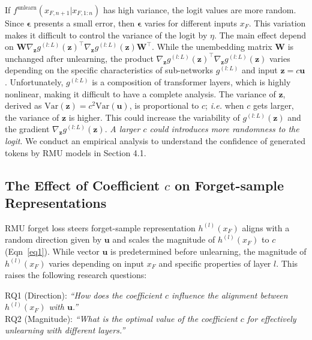 \documentclass[letterpaper]{article} %
\begin{document}
If $f^{\text{unlearn}}(x_{F,n+1}|x_{F,1:n})$ has high variance, the logit values are more random. Since $\bm\epsilon$ presents a small error, then $\bm\epsilon$ varies for different inputs $x_F$. This variation makes it difficult to control the variance of the logit by $\eta$. The main effect depend on $\bm W\nabla_{\bm z}g^{(l:L)}(\bm z)^{\top}\nabla_{\bm z}g^{(l:L)}(\bm z)\bm W^{\top}$. While the unembedding matrix $\bm W$ is unchanged after unlearning, the product $\nabla_{\bm z}g^{(l:L)}(\bm z)^{\top}\nabla_{\bm z}g^{(l:L)}(\bm z)$ varies depending on the specific characteristics of sub-networks $g^{(l:L)}$ and input $\bm z = c\bm u$. Unfortunately, $g^{(l:L)}$ is a composition of transformer layers, which is highly nonlinear, making it difficult to have a complete analysis. The variance of $\bm z$, derived as $\text{Var}(\bm z) = c^2\text{Var}(\bm u)$, is proportional to $c$; \textit{i.e.} when $c$ gets larger, the variance of $\bm z$ is higher. This could increase the variability of $g^{(l:L)}(\bm z)$ and the gradient $\nabla_{\bm z}g^{(l:L)}(\bm z)$. \textit{A larger $c$ could introduces more randomness to the logit}.  We conduct an empirical analysis to understand the confidence of generated tokens by RMU models in Section 4.1.

\subsection{The Effect of Coefficient $c$ on Forget-sample Representations}
\label{sec:3.2}
RMU forget loss steers forget-sample representation $h^{(l)}(x_F)$ aligns with a random direction given by $\bm u$ and scales the magnitude of $h^{(l)}(x_F)$ to $c$ (Eqn~\ref{eq1}). While vector $\bm u$ is predetermined before unlearning, the magnitude of $h^{(l)}(x_F)$ varies depending on input $x_F$ and specific properties of layer $l$. This raises the following research questions:

\noindent RQ1 (Direction): \textit{``How does the coefficient $c$ influence the alignment between $h^{(l)}(x_F)$ with $\bm u$.''}\\
RQ2 (Magnitude): \textit{``What is the optimal value of the coefficient $c$ for effectively unlearning with different layers.''}
\end{document}
